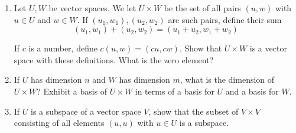 \begin{exercise}
    \begin{enumerate}[label={(\alph*)}]
        \item Let $U, W$ be vector spaces. We let $U\times W$ be the set of all pairs $(u, w)$ with $u\in U$ and $w\in W$. If $(u_{1}, w_{1}), (u_{2}, w_{2})$ are such pairs, define their sum
              \[
                  (u_{1}, w_{1}) + (u_{2}, w_{2}) = (u_{1} + u_{2}, w_{1} + w_{2})
              \]

              If $c$ is a number, define $c(u, w) = (cu, cw)$. Show that $U\times W$ is a vector space with these definitions. What is the zero element?
        \item If $U$ has dimension $n$ and $W$ has dimension $m$, what is the dimension of $U\times W$? Exhibit a basis of $U\times W$ in terms of a basis for $U$ and a basis for $W$.
        \item If $U$ is a subspace of a vector space $V$, show that the subset of $V\times V$ consisting of all elements $(u, u)$ with $u\in U$ is a subspace.
    \end{enumerate}
\end{exercise}

